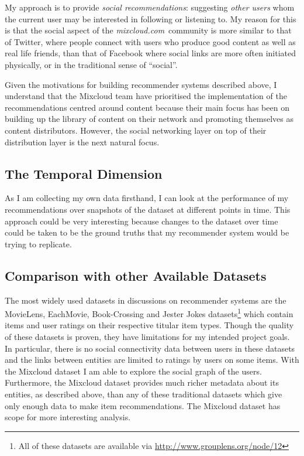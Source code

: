\documentclass[a4paper,12pt,twoside,notitlepage]{report}
\def\mixurl{\emph{mixcloud.com}}
\begin{document}
My approach is to provide \emph{social recommendations}: suggesting \emph{other
users} whom the current user may be interested in following or listening to. My
reason for this is that the social aspect of the \mixurl\ community is more
similar to that of Twitter, where people connect with users who produce good
content as well as real life friends, than that of Facebook where social links
are more often initiated physically, or in the traditional sense of ``social''.

Given the motivations for building recommender systems described above, I
understand that the Mixcloud team have prioritised the implementation of 
the recommendations centred around content because their main
focus has been on building up the library of content on their network and
promoting themselves as content distributors. However, the social networking
layer on top of their distribution layer is the next natural focus. 

\subsection{The Temporal Dimension}

As I am collecting my own data firsthand, I can look at the performance of my
recommendations over snapshots of the dataset at different points in time. This
approach could be very interesting because changes to the dataset over time
could be taken to be the ground truths that my recommender system would be
trying to replicate.


\subsection{Comparison with other Available Datasets}

The most widely used datasets in discussions on recommender systems are the 
MovieLens, EachMovie, Book-Crossing and Jester Jokes datasets\footnote{
All of these datasets are available via \url{http://www.grouplens.org/node/12}} 
which contain items and user ratings on their respective titular item types. 
Though the quality of these datasets is proven, they have limitations for my 
intended project goals. In particular, there is no social connectivity data 
between users in these datasets and the links between entities are limited to 
ratings by users on some items. With the Mixcloud dataset I am able to explore 
the social graph of the users. Furthermore, the Mixcloud dataset provides much 
richer metadata about its entities, as described above, than any of these 
traditional datasets which give only enough data to make item
recommendations. The Mixcloud dataset has scope for more interesting analysis.
\end{document}
